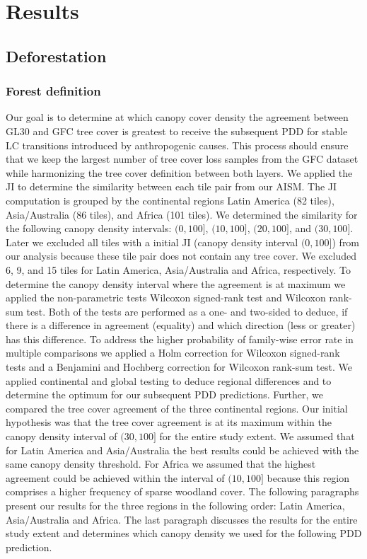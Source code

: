 \chapter{Results}
\label{ch:results}
	\section{Deforestation}
	\label{sec:results_deforestation}

		\subsection{Forest definition}
		\label{subsec:results_forest_definition}
			Our goal is to determine at which canopy cover density the agreement between \ac{GL30} and \ac{GFC} tree cover is greatest to receive the subsequent \ac{PDD} for stable \ac{LC} transitions introduced by anthropogenic causes. This process should ensure that we keep the largest number of tree cover loss samples from the \ac{GFC} dataset while harmonizing the tree cover definition between both layers. We applied the \ac{JI} to determine the similarity between each tile pair from our \ac{AISM}. The \ac{JI} computation is grouped by the continental regions Latin America (82 tiles), Asia/Australia (86 tiles), and Africa (101 tiles). We determined the similarity for the following canopy density intervals: $(0, 100]$, $(10, 100]$, $(20, 100]$, and $(30, 100]$. Later we excluded all tiles with a initial \ac{JI} (canopy density interval $(0,100]$) from our analysis because these tile pair does not contain any tree cover. We excluded 6, 9, and 15 tiles for Latin America, Asia/Australia and Africa, respectively. To determine the canopy density interval where the agreement is at maximum we applied the non-parametric tests Wilcoxon signed-rank test and Wilcoxon rank-sum test. Both of the tests are performed as a one- and two-sided to deduce, if there is a difference in agreement (equality) and which direction (less or greater) has this difference. To address the higher probability of family-wise error rate in multiple comparisons we applied a Holm correction for Wilcoxon signed-rank tests and a Benjamini and Hochberg correction for Wilcoxon rank-sum test. We applied continental and global testing to deduce regional differences and to determine the optimum for our subsequent \ac{PDD} predictions. Further, we compared the tree cover agreement of the three continental regions. Our initial hypothesis was that the tree cover agreement is at its maximum within the canopy density interval of $(30,100]$ for the entire study extent. We assumed that for Latin America and Asia/Australia the best results could be achieved with the same canopy density threshold. For Africa we assumed that the highest agreement could be achieved within the interval of $(10,100]$ because this region comprises a higher frequency of sparse woodland cover. The following paragraphs present our results for the three regions in the following order: Latin America, Asia/Australia and Africa. The last paragraph discusses the results for the entire study extent and determines which canopy density we used for the following \ac{PDD} prediction.

